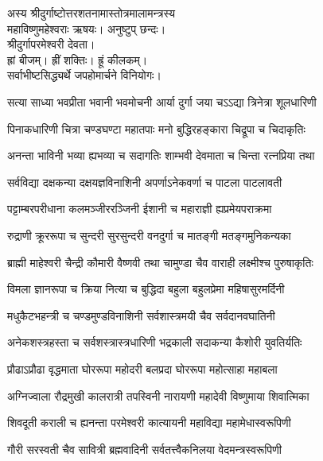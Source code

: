 
अस्य श्रीदुर्गाष्टोत्तरशतनामास्तोत्रमालामन्त्रस्य\\
महाविष्णुमहेश्वराः ऋषयः। अनुष्टुप् छन्दः।\\
श्रीदुर्गापरमेश्वरी देवता।\\
ह्रां बीजम्। ह्रीं शक्तिः। ह्रूं कीलकम्।\\
सर्वाभीष्टसिद्ध्यर्थे जपहोमार्चने विनियोगः।\\

\begin{minipage}{\linewidth}
\centering
{}
\twolineshloka
{सत्या साध्या भवप्रीता भवानी भवमोचनी}
{आर्या दुर्गा जया चऽऽद्या त्रिनेत्रा शूलधारिणी}
\end{minipage}

\twolineshloka
{पिनाकधारिणी चित्रा चण्डघण्टा महातपाः}
{मनो बुद्धिरहङ्कारा चिद्रूपा च चिदाकृतिः}

\twolineshloka
{अनन्ता भाविनी भव्या ह्यभव्या च सदागतिः}
{शाम्भवी देवमाता च चिन्ता रत्नप्रिया तथा}

\twolineshloka
{सर्वविद्या दक्षकन्या दक्षयज्ञविनाशिनी}
{अपर्णाऽनेकवर्णा च पाटला पाटलावती}

\twolineshloka
{पट्टाम्बरपरीधाना कलमञ्जीररञ्जिनी}
{ईशानी च महाराज्ञी ह्यप्रमेयपराक्रमा}

\twolineshloka
{रुद्राणी क्रूररूपा च सुन्दरी सुरसुन्दरी}
{वनदुर्गा च मातङ्गी मतङ्गमुनिकन्यका}

\twolineshloka
{ब्राह्मी माहेश्वरी चैन्द्री कौमारी वैष्णवी तथा}
{चामुण्डा चैव वाराही लक्ष्मीश्च पुरुषाकृतिः}

\twolineshloka
{विमला ज्ञानरूपा च क्रिया नित्या च बुद्धिदा}
{बहुला बहुलप्रेमा महिषासुरमर्दिनी}

\twolineshloka
{मधुकैटभहन्त्री च चण्डमुण्डविनाशिनी}
{सर्वशास्त्रमयी चैव सर्वदानवघातिनी}

\twolineshloka
{अनेकशस्त्रहस्ता च सर्वशस्त्रास्त्रधारिणी}
{भद्रकाली सदाकन्या कैशोरी युवतिर्यतिः}

\twolineshloka
{प्रौढाऽप्रौढा वृद्धमाता घोररूपा महोदरी}
{बलप्रदा घोररूपा महोत्साहा महाबला}

\twolineshloka
{अग्निज्वाला रौद्रमुखी कालरात्री तपस्विनी}
{नारायणी महादेवी विष्णुमाया शिवात्मिका}

\twolineshloka
{शिवदूती कराली च ह्यनन्ता परमेश्वरी}
{कात्यायनी महाविद्या महामेधास्वरूपिणी}

\twolineshloka
{गौरी सरस्वती चैव सावित्री ब्रह्मवादिनी}
{सर्वतत्त्वैकनिलया वेदमन्त्रस्वरूपिणी}

